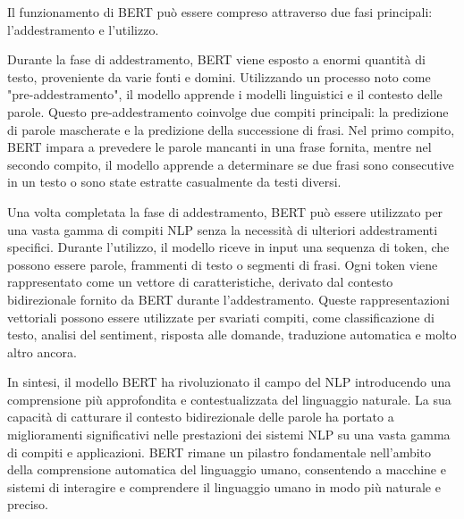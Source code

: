 \documentclass[12pt,a4paper]{report}
\begin{document}
Il funzionamento di BERT può essere compreso attraverso due fasi principali: l'addestramento e l'utilizzo.

Durante la fase di addestramento, BERT viene esposto a enormi quantità di testo, proveniente da varie fonti e domini. Utilizzando un processo noto come "pre-addestramento", il modello apprende i modelli linguistici e il contesto delle parole. Questo pre-addestramento coinvolge due compiti principali: la predizione di parole mascherate e la predizione della successione di frasi. Nel primo compito, BERT impara a prevedere le parole mancanti in una frase fornita, mentre nel secondo compito, il modello apprende a determinare se due frasi sono consecutive in un testo o sono state estratte casualmente da testi diversi.

Una volta completata la fase di addestramento, BERT può essere utilizzato per una vasta gamma di compiti NLP senza la necessità di ulteriori addestramenti specifici. Durante l'utilizzo, il modello riceve in input una sequenza di token, che possono essere parole, frammenti di testo o segmenti di frasi. Ogni token viene rappresentato come un vettore di caratteristiche, derivato dal contesto bidirezionale fornito da BERT durante l'addestramento. Queste rappresentazioni vettoriali possono essere utilizzate per svariati compiti, come classificazione di testo, analisi del sentiment, risposta alle domande, traduzione automatica e molto altro ancora.

In sintesi, il modello BERT ha rivoluzionato il campo del NLP introducendo una comprensione più approfondita e contestualizzata del linguaggio naturale. La sua capacità di catturare il contesto bidirezionale delle parole ha portato a miglioramenti significativi nelle prestazioni dei sistemi NLP su una vasta gamma di compiti e applicazioni. BERT rimane un pilastro fondamentale nell'ambito della comprensione automatica del linguaggio umano, consentendo a macchine e sistemi di interagire e comprendere il linguaggio umano in modo più naturale e preciso.


\nocite{*}
\end{document}
